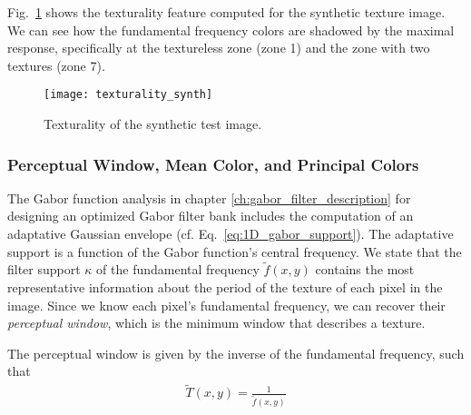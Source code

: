 Fig.\ \ref{fig:texturality_synth} shows the texturality feature computed for the synthetic texture image. We can see how the fundamental frequency colors are shadowed by the maximal response, specifically at the textureless zone (zone 1) and the zone with two textures (zone 7).

\begin{figure}[!ht]
	\texttt{[image: texturality\_synth]}
    \caption{Texturality of the synthetic test image.}
    \label{fig:texturality_synth}
\end{figure}

%                  

\subsubsection{Perceptual Window, Mean Color, and Principal Colors}
The Gabor function analysis in chapter \ref{ch:gabor_filter_description} for designing an optimized Gabor filter bank includes the computation of an adaptative Gaussian envelope (cf. Eq.\ \eqref{eq:1D_gabor_support}). The adaptative support is a function of the Gabor function's central frequency. We state that the filter support $\kappa$ of the fundamental frequency $\widetilde{f}(x,y)$ contains the most representative information about the period of the texture of each pixel in the image. Since we know each pixel's fundamental frequency, we can recover their \textit{perceptual window}, which is the minimum window that describes a texture.

The perceptual window is given by the inverse of the fundamental frequency, such that
\begin{gather}
    \widetilde{T}(x,y) = \frac{1}{\widetilde{f}(x,y)} \label{eq:perceptual_window}
\end{gather}

